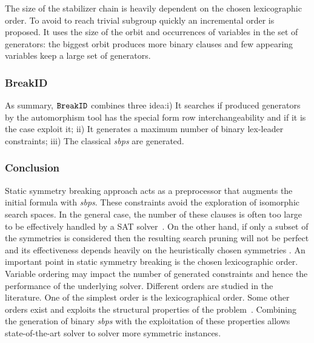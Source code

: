 The size of the stabilizer chain is heavily dependent on the chosen lexicographic order.
To avoid to reach trivial subgroup quickly an incremental order is proposed.
It uses the size of the orbit and occurrences of variables in the set of generators:
the biggest orbit produces more binary clauses and few appearing variables keep a large set of generators.


\subsubsection{BreakID}
As summary, $\texttt{BreakID}$ combines three idea:i) It searches if produced generators by the automorphism tool has the special form row interchangeability and if it is the case exploit it;
ii) It generates a maximum number of binary lex-leader constraints; iii) The classical \textit{sbps} are 
generated.



%


\subsubsection{Conclusion}
Static symmetry breaking approach acts as a preprocessor that augments the initial formula with
\textit{sbps}. These constraints avoid the exploration of isomorphic search spaces.
In the general case, the number of these clauses is often too large to be
effectively handled by a SAT solver~\cite{Luks2004}. 
On the other hand, if only a subset of the symmetries is considered then the resulting search pruning
will not be perfect and its effectiveness depends heavily on the
heuristically chosen symmetries \cite{biere2009handbook}.
An important point in static symmetry breaking is the chosen lexicographic order.
Variable ordering may impact the number of generated constraints and hence the performance of
the underlying solver. Different orders are studied in the literature. 
One of the simplest order is the  lexicographical order.
Some other orders exist and exploits the structural properties of the 
problem~\cite{devriendt2016improved}. Combining the generation of binary \textit{sbps} with the exploitation of
these properties allows state-of-the-art solver to solver more symmetric instances.

